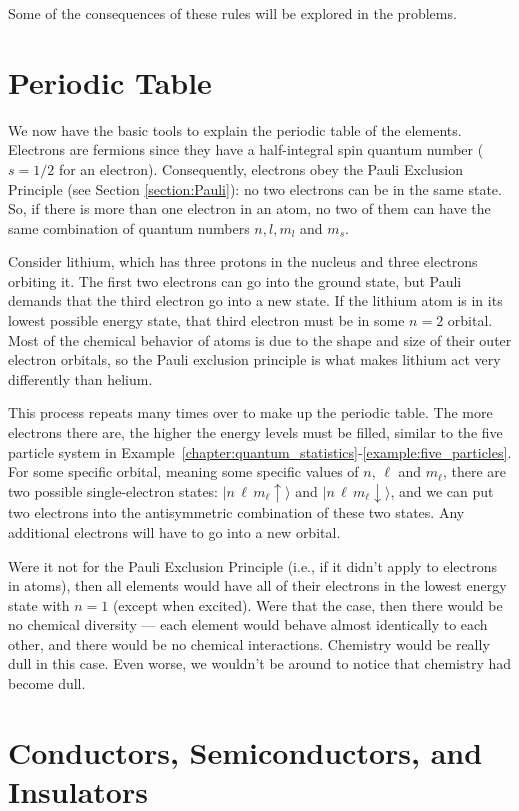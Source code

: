 Some of the consequences of these rules will be explored in the
problems.

\section{Periodic Table}

We now have the basic tools to explain the periodic table of the 
elements. Electrons are fermions since they have a half-integral
spin quantum number ($s = 1/2$ for an electron). Consequently,
electrons obey the Pauli Exclusion Principle (see Section
\ref{section:Pauli}): no two electrons can be in the same
state. So, if there is more than one electron in an atom, no
two of them can have the same combination of quantum numbers
$n, l, m_l$ and $m_s$.

Consider lithium, which has three protons in the nucleus
and three electrons orbiting it.  The first two electrons can go into
the ground state, but Pauli demands that the third electron go into a
new state.  If the lithium atom is in its lowest possible energy
state, that third electron must be in some $n=2$ orbital.  Most of the
chemical behavior of atoms is due to the shape and size of their outer
electron orbitals, so the Pauli exclusion principle is what makes
lithium act very differently than helium.

This process repeats many times over to make up the periodic table.
The more electrons there are, the higher the energy levels must be filled,
similar to the five particle system in Example~\ref{chapter:quantum_statistics}-\ref{example:five_particles}.
For some specific orbital, meaning some specific values of $n$, $\ell$
and $m_\ell$, there are two possible single-electron states:
$|n\,\ell\,m_\ell\uparrow\rangle$ and
$|n\,\ell\,m_\ell\downarrow\rangle$, and we can put two electrons into
the antisymmetric combination of these two states.  Any additional
electrons will have to go into a new orbital.

Were it not for the Pauli Exclusion Principle (i.e., if it didn't apply
to electrons in atoms), then all elements would have all of their
electrons in the lowest energy state with $n = 1$ (except when
excited). Were that the case, then there would be no chemical diversity ---
each element would behave almost identically to each other, and
there would be no chemical interactions. Chemistry would be really dull
in this case. Even worse, we wouldn't be around to notice that chemistry
had become dull.

\section{Conductors, Semiconductors, and Insulators}

